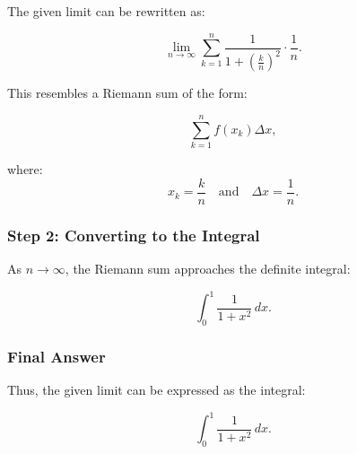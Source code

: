 \documentclass{article}
\begin{document}
The given limit can be rewritten as:

\begin{equation*}
\lim_{n \to \infty}\sum_{k=1}^n \frac{1}{1+\left( \frac{k}{n} \right)^2} \cdot \frac{1}{n}.
\end{equation*}

This resembles a Riemann sum of the form:

\[
\sum_{k=1}^n f(x_k) \Delta x,
\]

where:
\[
x_k = \frac{k}{n} \quad \text{and} \quad \Delta x = \frac{1}{n}.
\]

\subsubsection*{Step 2: Converting to the Integral}

As \(n \to \infty\), the Riemann sum approaches the definite integral:

\begin{equation*}
\int_0^1 \frac{1}{1 + x^2} \, dx.
\end{equation*}

\subsubsection*{Final Answer}

Thus, the given limit can be expressed as the integral:

\begin{equation*}
\boxed{\int_0^1 \frac{1}{1 + x^2} \, dx.}
\end{equation*}
\end{document}
